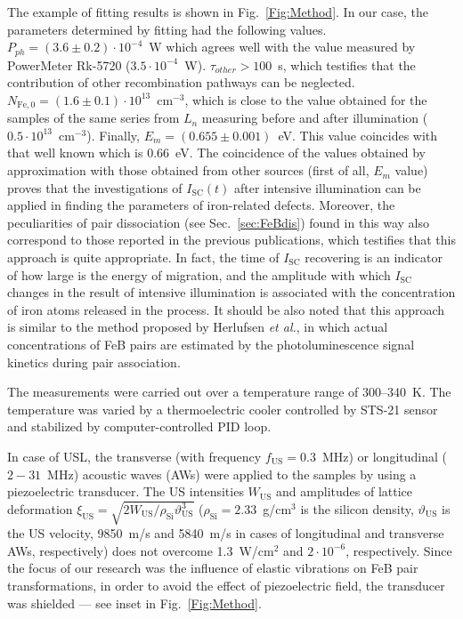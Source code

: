 \documentclass[%
 aip,jap,
 amsmath,amssymb,
 reprint,%
]{revtex4-1}
\begin{document}
The example of fitting results is shown in Fig.~\ref{Fig:Method}. 
In our case, the parameters determined by fitting had the following values. 
$P_{ph} = (3.6\pm0.2)\cdot10^{-4}$~W which agrees well 
with the value measured by PowerMeter Rk-5720 ($3.5\cdot10^{-4}$~W). 
$\tau_{other}>100$~s, which testifies that the contribution of other recombination pathways can be neglected. 
$N_\mathrm{Fe,0}=(1.6\pm0.1)\cdot10^{13}$~cm$^{-3}$, 
which is close to the value obtained for the samples of the same series from $L_n$ measuring before and after illumination ($0.5\cdot10^{13}$~cm$^{-3}$). 
Finally, $E_m = (0.655\pm0.001)$~eV. 
This value coincides with that well known \cite{FeBAssJAP2014,FeBkinAPL2008,FeBKin2019,FeBAssSST2011} which is $0.66$~eV.
The coincidence of the values obtained by approximation 
with those obtained from other sources (first of all, $E_m$ value) proves 
that the investigations of $I_\mathrm{SC}(t)$ after intensive illumination can be applied in finding the parameters of iron-related defects. 
Moreover, the peculiarities of pair dissociation (see Sec.~\ref{sec:FeBdis}) found in this way also correspond to those reported in the previous publications, which testifies that this approach is quite appropriate.
In fact, the time of $I_\mathrm{SC}$ recovering is an indicator of how large is the energy of migration, 
and the amplitude with which $I_\mathrm{SC}$ changes in the result of intensive illumination is associated with the concentration of iron atoms released in the process. 
It should be also noted that this approach is similar to the method proposed 
by Herlufsen \emph{et al.}\cite{FeMethod2012}, in which actual concentrations of FeB pairs are estimated by the photoluminescence signal kinetics during pair association.

The measurements were carried out over a temperature range of $300–340$~K. 
The temperature was varied by a thermoelectric cooler controlled by STS-21 sensor and stabilized by computer-controlled PID loop.

In case of USL, the transverse (with frequency $f_\mathrm{US}=0.3$~MHz) or 
longitudinal ($2-31$~MHz) acoustic waves (AWs) were applied to the samples by using a piezoelectric transducer.
The US intensities $W_\mathrm{US}$ and amplitudes of lattice deformation 
$\xi_\mathrm{US}=\sqrt{2W_\mathrm{US}/\rho_\mathrm{Si}\vartheta_\mathrm{US}^3}$ 
($\rho_\mathrm{Si}=2.33$~g/cm$^3$ is the silicon density, 
$\vartheta_\mathrm{US}$ is the US velocity, 9850~m/s and 5840~m/s in cases of longitudinal and transverse AWs, respectively) 
does not overcome 1.3~W/cm$^2$ and $2\cdot10^{-6}$, respectively.
Since the focus of our research was the influence of elastic vibrations on  FeB pair transformations,   in order to avoid the effect of piezoelectric field, the transducer was shielded --– see inset in Fig.~\ref{Fig:Method}.
\end{document}
